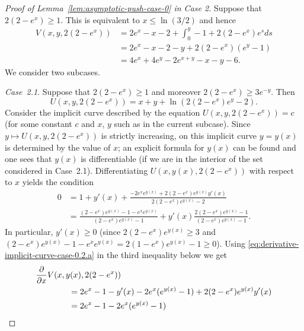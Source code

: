 \documentclass[a4paper]{amsart} %
\theoremstyle{definition}
\theoremstyle{remark}
\numberwithin{equation}{section}
\newcommand*{\XXXasymptoticDenominator}{V}
\newcommand*{\XXXasymptoticNominator}{U}
\begin{document}
    \begin{proof}[Proof of Lemma~\ref{lem:asymptotic-push-case-0} in Case 2]
	Suppose that $2(2-e^x) \geq 1$.
	This is equivalent to $x\leq \ln(3/2)$ and hence
	\begin{align*}
	\XXXasymptoticDenominator(x,y,2(2-e^x)) &= 2e^x - x -2 + \int_{0}^{y} -1 +  2(2-e^x)  e^{s} ds\\
	& = 2e^x - x- 2 - y + 2(2-e^x)(e^y-1)\\
	&= 4e^x + 4 e^y -2e^{x+y} -x -y - 6. 
	\end{align*}
	We consider two subcases.
	
	\emph{Case~2.1}. Suppose that $2(2-e^x) \geq 1 $ and moreover $2(2-e^x) \geq 3e^{-y}$.
	Then
	\begin{equation*}
	\XXXasymptoticNominator(x,y,2(2-e^x)) = x + y + \ln(2(2-e^x) e^y  -2).
	\end{equation*}
	Consider the implicit curve described by the equation $\XXXasymptoticNominator(x,y,2(2-e^x)) = c$
	(for some constant $c$ and $x$, $y$ such as in the current subcase).
	Since $y\mapsto \XXXasymptoticNominator(x,y,2(2-e^x)) $ is strictly increasing, on this implicit curve
	$y = y(x)$ is determined by the value of $x$;
   an explicit formula for $y(x)$ can be found
		and one sees that $y(x)$ is differentiable 
		(if we are in the interior of the set considered in Case~2.1).
	Differentiating $\XXXasymptoticNominator(x,y(x),2(2-e^{x})) $ with respect to $x$
	yields the condition
	\begin{align}
	\label{eq:derivative-implicit-curve-case-0.2.a}
	0 &= 1 + y'(x) + \frac{-2e^{x} e^{y(x)} + 2(2-e^x) e^{y(x)} y'(x)}{2(2-e^{x})e^{y(x)} - 2}
	\\
	&= 
	\frac{(2-e^{x})e^{y(x)} - 1 -e^{x} e^{y(x)}}{(2-e^{x})e^{y(x)} - 1}
	+ y'(x)\frac{2(2-e^x) e^{y(x)} - 1}{(2-e^{x})e^{y(x)} - 1}
	.\nonumber
	\end{align}
	In particular, $y'(x) \geq 0$
	 (since $2(2-e^{x}) e^{y(x)} \geq 3$
	 and $(2-e^{x})e^{y(x)} - 1 -e^{x} e^{y(x)}
	 = 2(1-e^{x})e^{y(x)} - 1 \geq 0$).
	Using \eqref{eq:derivative-implicit-curve-case-0.2.a} in the third inequality below we get
	\begin{align*}
	\MoveEqLeft[4]
	\frac{\partial}{\partial x} \XXXasymptoticDenominator(x, y(x), 2(2-e^{x})) \\
	&= 2e^{x} - 1  - y'(x)
	- 2e^{x} (e^{y(x)} - 1) + 2(2-e^{x}) e^{y(x)} y'(x) \\
	&=2e^{x} - 1 - 2e^{x} (e^{y(x)} - 1) 

\end{align*}
\end{proof}
\end{document}

